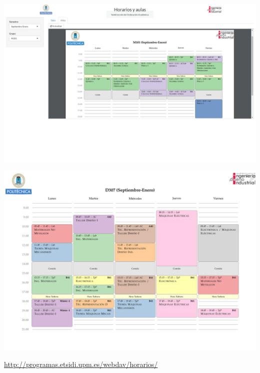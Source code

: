 \documentclass[spanish, xcolor={usenames,svgnames,dvipsnames}]{beamer}
\begin{document}
\begin{frame}[label={sec:org3673986}]{}
\begin{center}
\includegraphics[width=.9\linewidth]{images/horarios_tt.png}
\end{center}
\end{frame}

\begin{frame}[label={sec:org5a1762e}]{}
\begin{center}
\includegraphics[width=.9\linewidth]{images/D307_1.pdf}
\end{center}

\url{http://programas.etsidi.upm.es/webdav/horarios/}
\end{frame}
\end{document}
